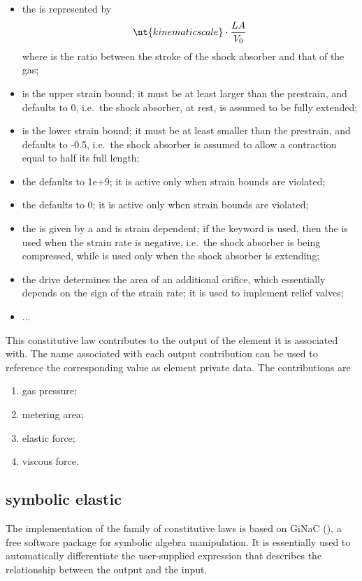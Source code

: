 \begin{itemize}
\item the  is represented by
\begin{displaymath}
	\nt{kinematic scale} \cdot \frac{L A}{V_0}
\end{displaymath}
where  is the ratio between the stroke
of the shock absorber and that of the gas;
\item {} is the upper strain bound; it must be
at least larger than the prestrain, and defaults to 0,
i.e.\ the shock absorber, at rest, is assumed to be fully
extended;
\item {} is the lower strain bound; it must be
at least smaller than the prestrain, and defaults to -0.5, 
i.e.\ the shock absorber is assumed to allow a contraction
equal to half its full length;
\item the  defaults to 1e+9;
it is active only when strain bounds are violated;
\item the  defaults to 0;
it is active only when strain bounds are violated;
\item the  is given by a  
and is strain dependent; if the keyword  is used, 
then the  is used
when the strain rate is negative, i.e.\ the shock absorber
is being compressed, while  is used only
when the shock absorber is extending;
\item the  drive determines the area of an
additional orifice, which essentially depends on the sign
of the strain rate; it is used to implement relief valves;
\item ...
\end{itemize}
This constitutive law contributes to the output of the element
it is associated with.
The name associated with each output contribution can be used to reference
the corresponding value as element private data.
The contributions are
\begin{enumerate}
\item {} gas pressure;
\item {} metering area;
\item {} elastic force;
\item {} viscous force.
\end{enumerate}

\subsection{symbolic elastic}\label{sec:CL:SYMBOLIC-ELASTIC}
The implementation  of the family of  constitutive laws
is based on GiNaC 
(),
a free software package for symbolic algebra manipulation.
It is essentially used to automatically differentiate
the user-supplied expression that describes the relationship
between the output and the input.

